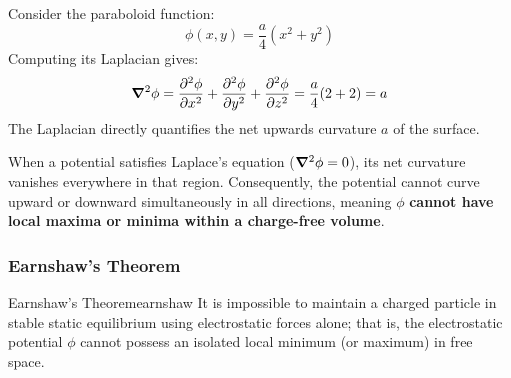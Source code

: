 \begin{example}
Consider the paraboloid function:
\begin{equation}
    \phi(x, y) = \frac{a}{4}\left(x^2 + y^2\right)
\end{equation}
Computing its Laplacian gives:
\begin{equation}
    \grad^2\phi = \pdv[2]{\phi}{x} + \pdv[2]{\phi}{y} + \pdv[2]{\phi}{z} = \frac{a}{4}(2 + 2) = a
\end{equation}
The Laplacian directly quantifies the net upwards curvature $a$ of the surface.

\begin{center}
\end{center}

When a potential satisfies Laplace's equation ($\grad^2\phi = 0$), its net curvature vanishes everywhere in that region. Consequently, the potential cannot curve upward or downward simultaneously in all directions, meaning $\phi$ \textbf{cannot have local maxima or minima within a charge-free volume}.
\end{example}

\subsubsection{Earnshaw's Theorem}

\begin{theorem}{Earnshaw's Theorem}{earnshaw}
It is impossible to maintain a charged particle in stable static equilibrium using electrostatic forces alone; that is, the electrostatic potential $\phi$ cannot possess an isolated local minimum (or maximum) in free space.
\end{theorem}

